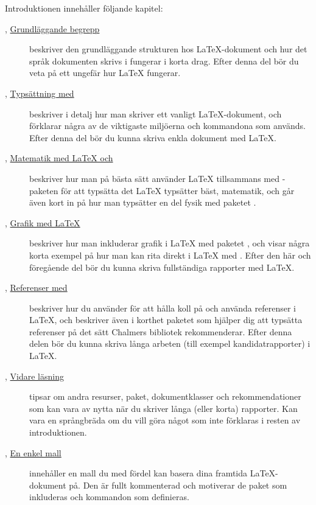 \documentclass[10pt,../../a4.tex]{subfiles}
\begin{document}
Introduktionen innehåller följande kapitel:
\begin{description}
	\item[{, \hyperref[sec:1]{Grundläggande begrepp}}]
	beskriver den grundläggande strukturen hos \LaTeX-dokument och hur det
	språk dokumenten skrivs i fungerar i korta drag. Efter denna del bör
	du veta på ett ungefär hur \LaTeX{} fungerar.
	
	\item[{, \hyperref[sec:2]{Typsättning med \pdfLaTeX}}]
	beskriver i detalj hur man skriver ett vanligt
	\LaTeX-dokument, och förklarar några av de viktigaste miljöerna
	och kommandona som används. Efter denna del bör du kunna skriva enkla
	dokument med \LaTeX.
	
	\item[{, \hyperref[sec:3]{Matematik med \LaTeX{} och 
	\AmS}}]
	beskriver hur man på bästa sätt använder \LaTeX{} tillsammans med
	\AmS-paketen för att typsätta det \LaTeX{} typsätter bäst, matematik,
	och går även kort in på hur man typsätter en del fysik med paketet
	.
	
	\item[{, \hyperref[sec:4]{Grafik med \LaTeX}}]
	beskriver hur man inkluderar grafik i \LaTeX{} med paketet
	, och visar några korta exempel på hur man kan rita
	direkt i \LaTeX{} med \PGFTikZ{}. Efter den här och föregående del bör
	du kunna skriva fullständiga rapporter med \LaTeX.
	
	\item[{, \hyperref[sec:5]{Referenser med \BibTeX}}]
	beskriver hur du använder \BibTeX{} för att hålla koll på och använda
	referenser i \LaTeX, och beskriver även i korthet paketet  som
	hjälper dig att typsätta referenser på det sätt Chalmers bibliotek
	rekommenderar. Efter denna delen bör du kunna skriva långa arbeten
	(till exempel kandidatrapporter) i \LaTeX.
	
	\item[{, \hyperref[sec:6]{Vidare läsning}}]
	tipsar om andra resurser, paket, dokumentklasser och rekommendationer
	som kan vara av nytta när du skriver långa (eller korta) rapporter.
	Kan vara en språngbräda om du vill göra något som inte förklaras i
	resten av introduktionen.
	
	\item[, {\hyperref[app:1]{En enkel mall}}]
	innehåller en mall du med fördel kan basera dina framtida 
	\LaTeX{}-dokument
	på. Den är fullt kommenterad och motiverar de paket som inkluderas och
	kommandon som definieras.
\end{description}
\end{document}
